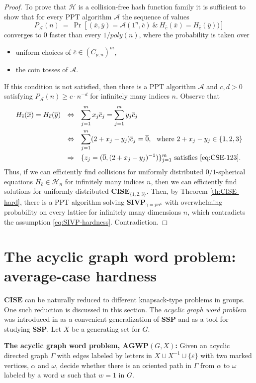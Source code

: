 \documentclass{jgcc}
\def\ovc{{\overline{c}}}
\def\ovo{{\overline{0}}}
\def\ovx{{\overline{x}}}
\def\ovy{{\overline{y}}}
\def\CA{{\mathcal A}}
\def\CH{{\mathcal H}}
\def\SIVP{{\mathbf{SIVP}}}
\def\AGP{{\mathbf{AGWP}}}
\def\SSP{{\mathbf{SSP}}}
\def\CISE{{\mathbf{CISE}}}
\begin{document}
\begin{proof}
To prove that $\CH$ is a collision-free hash function family
it is sufficient to show that for every PPT algorithm $\CA$ the sequence of values
$$
P_\CA(n)\ =\ \Pr[(\ovx,\ovy)=\CA(1^n,\ovc)\ \&\ H_\ovc(\ovx)=H_\ovc(\ovy))]
$$
converges to $0$ faster than every $1/poly(n)$,
where the probability is taken over
\begin{itemize}
\item 
uniform choices of $\ovc\in (C_{p,n})^m$,
\item 
the coin tosses of $\CA$.
\end{itemize}
If this condition is not satisfied, then there is a PPT algorithm $\CA$
and $c,d>0$ satisfying $P_\CA(n) \ge c\cdot n^{-d}$ for infinitely many
indices $n$. Observe that
\begin{align*}
H_\ovc(\ovx)=H_\ovc(\ovy)
&\ \ \Leftrightarrow\ \ 
\sum_{j=1}^m x_j \ovc_j = \sum_{j=1}^m y_j \ovc_j\\
&\ \ \Leftrightarrow\ \ 
\sum_{j=1}^m (2+x_j-y_j) \ovc_j = \ovo,
\ \ \mbox{where } 2+x_j-y_j\in\{1,2,3\}
\\
&\ \ \Rightarrow\ \ 
\{z_j=(\ovo,(2+x_j-y_j)^{-1})\}_{j=1}^m
\mbox{ satisfies \eqref{eq:CSE-123}.}
\end{align*}
Thus, if we can efficiently find collisions for uniformly distributed 
$0/1$-spherical equations $H_\ovc\in \CH_n$ for infinitely many
indices $n$, then
we can efficiently find solutions for uniformly 
distributed $\CISE_{\{1,2,3\}}$.
Then, by Theorem \ref{th:CISE-hard}, there is a PPT algorithm 
solving $\SIVP_{\gamma=pn^6}$ with overwhelming probability 
on every lattice for infinitely many dimensions $n$, 
which contradicts the assumption \eqref{eq:SIVP-hardness}. 
Contradiction.
\end{proof}

\section{The acyclic graph word problem: average-case hardness}
\label{se:agwp}

$\CISE$ can be naturally reduced to different knapsack-type problems
in groups. One such reduction is discussed in this section.
The \emph{acyclic graph word problem} was introduced in 
\cite{Frenkel-Nikolaev-Ushakov:2014} as a convenient
generalization of $\SSP$ and as a tool for studying $\SSP$.
Let $X$ be a generating set for $G$.

\medskip\noindent
\textbf{The acyclic graph word problem, $\AGP(G,X)$:}
Given an acyclic directed graph $\Gamma$ with edges labeled by letters 
in $X\cup X^{-1}\cup \{\varepsilon\}$ with two marked vertices, $\alpha$ and $\omega$, decide whether there is an oriented path in $\Gamma$ from $\alpha$ to $\omega$ labeled by a word $w$ such that $w=1$ in $G$.
\end{document}

